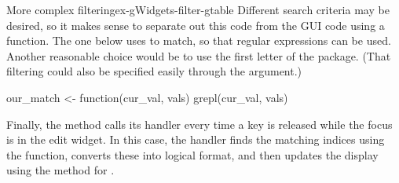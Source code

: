 \begin{example}{More complex filtering}{ex-gWidgets-filter-gtable}
Different search criteria may be desired, so it makes sense to
separate out this code from the GUI code using a function. The one below
uses  to match, so that regular expressions can be
used. Another reasonable choice would be to use the first letter of
the package. (That filtering could also be specified easily through the
 argument.)

\begin{Schunk}
\begin{Sinput}
 our_match <- function(cur_val, vals) {
   grepl(cur_val, vals)
 }
\end{Sinput}
\end{Schunk}

Finally, the  method calls its handler
every time a key is released while the focus is in the edit widget. In
this case, the handler finds the matching indices using the
 function, converts these into logical format, and then
updates the display using the  method for
  .
\begin{Schunk}
\end{Schunk}
\end{example}


